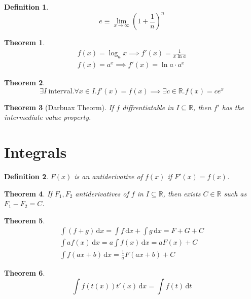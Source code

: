 \documentclass[]{article}
\newtheorem{theorem}{Theorem}[section]
\newtheorem{definition}{Definition}[section]
\newcommand\R     {\mathbb{R}}
\newcommand\dx    {\,\mathrm{d}x}
\newcommand\dt    {\,\mathrm{d}t}
\newcommand\limi  {\lim_{x \to \infty}}
\newcommand\cl [1]    {\left ( #1 \right )}
\begin{document}
\begin{multicols}{2}
		\begin{definition}
			\[ e \equiv \limi \cl{1 + \frac{1}{n}}^{n} \]
		\end{definition}
		
		\begin{theorem}
			\begin{gather*}
				f(x) = \log_ax \implies f'(x) = \frac{1}{x\ln a} \\
				f(x) = a^x \implies f'(x) = \ln a \cdot a^{x}
			\end{gather*}
		\end{theorem}
		
		\begin{theorem}
			\[ \exists I \ \mathrm{interval}. \forall x \in I. f'(x) = f(x) \implies \exists c \in \R. f(x) = ce^x \]
		\end{theorem}
		
		\begin{theorem}[Darbuax Theorm]
			If $f$ diffrentiatable in $I \subseteq \R$, then $f'$ has the intermediate value property. 
		\end{theorem}
		
		
		
		\section{Integrals}
		
		\begin{definition}
			$F(x)$ is an antiderivative of $f(x)$ if $F'(x) = f(x)$. 
		\end{definition}
		
		\begin{theorem}
			If $F_1, F_2$ antiderivatives of $f$ in $I \subseteq \R$, then exists $C \in \R$ such as $F_1 - F_2 = C$. 
		\end{theorem}
		
		\begin{theorem}
			\begin{gather*}
				\int (f + g)\dx = \int f\dx + \int g \dx = F + G + C \\
				\int af(x) \dx = a \int f(x)\dx = aF(x) + C \\
				\int f(ax + b)\dx  = \frac{1}{a} F(ax + b) + C
			\end{gather*}
		\end{theorem}
		
		\begin{theorem}
			\[ \int f(t(x))t'(x)\dx = \int f(t)\dt \]
		\end{theorem}
		

\end{multicols}
\end{document}
